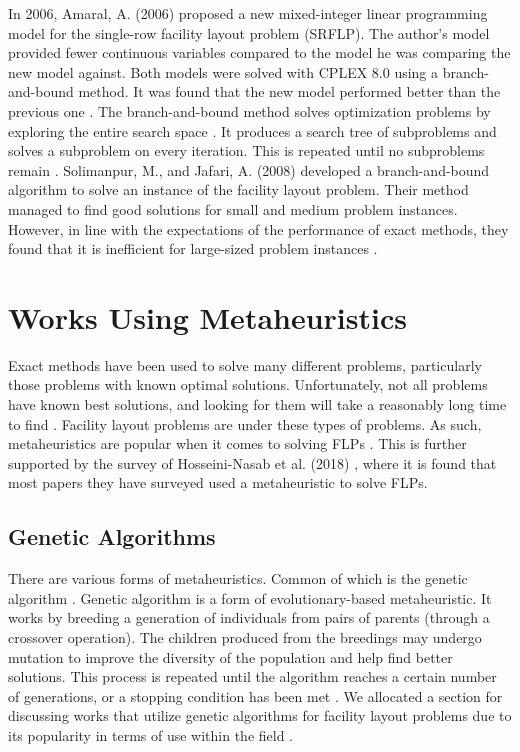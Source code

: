 In 2006, Amaral, A. (2006) proposed a new mixed-integer linear programming model for the single-row facility layout problem (SRFLP). The author's model provided fewer continuous variables compared to the model he was comparing the new model against. Both models were solved with CPLEX 8.0 using a branch-and-bound method. It was found that the new model performed better than the previous one \cite{Amaral2006}. The branch-and-bound method solves optimization problems by exploring the entire search space \cite{Datta2020}. It produces a search tree of subproblems and solves a subproblem on every iteration. This is repeated until no subproblems remain \cite{Morrison2016}. Solimanpur, M., and Jafari, A. (2008) developed a branch-and-bound algorithm to solve an instance of the facility layout problem. Their method managed to find good solutions for small and medium problem instances. However, in line with the expectations of the performance of exact methods, they found that it is inefficient for large-sized problem instances \cite{Solimanpur2008}.

\section{Works Using Metaheuristics}
Exact methods have been used to solve many different problems, particularly those problems with known optimal solutions. Unfortunately, not all problems have known best solutions, and looking for them will take a reasonably long time to find \cite{Glover2015}. Facility layout problems are under these types of problems. As such, metaheuristics are popular when it comes to solving FLPs \cite{Drira2007}. This is further supported by the survey of Hosseini-Nasab et al. (2018) \cite{Hosseini-Nasab2018}, where it is found that most papers they have surveyed used a metaheuristic to solve FLPs.

\subsection{Genetic Algorithms}
There are various forms of metaheuristics. Common of which is the genetic algorithm \cite{Hosseini-Nasab2018}. Genetic algorithm is a form of evolutionary-based metaheuristic. It works by breeding a generation of individuals from pairs of parents (through a crossover operation). The children produced from the breedings may undergo mutation to improve the diversity of the population and help find better solutions. This process is repeated until the algorithm reaches a certain number of generations, or a stopping condition has been met \cite{Luke2013Metaheuristics}. We allocated a section for discussing works that utilize genetic algorithms for facility layout problems due to its popularity in terms of use within the field \cite{Hosseini-Nasab2018}.


